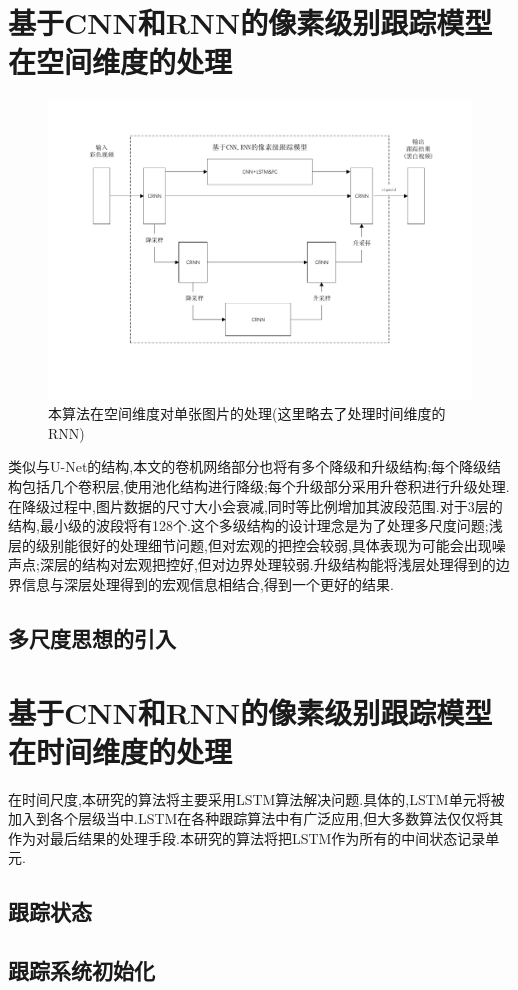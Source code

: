 \section{基于CNN和RNN的像素级别跟踪模型在空间维度的处理}
\par
\begin{figure}[htbp!]
    \centering
    \includegraphics[width = 1.\textwidth]{chap/img/space_process.pdf}
    \caption{本算法在空间维度对单张图片的处理(这里略去了处理时间维度的RNN)}
    \label{fig:space_process}
\end{figure}
\par
类似与U-Net的结构,本文的卷机网络部分也将有多个降级和升级结构;每个降级结构包括几个卷积层,使用池化结构进行降级;每个升级部分采用升卷积进行升级处理.在降级过程中,图片数据的尺寸大小会衰减,同时等比例增加其波段范围.对于3层的结构,最小级的波段将有128个.这个多级结构的设计理念是为了处理多尺度问题;浅层的级别能很好的处理细节问题,但对宏观的把控会较弱,具体表现为可能会出现噪声点;深层的结构对宏观把控好,但对边界处理较弱.升级结构能将浅层处理得到的边界信息与深层处理得到的宏观信息相结合,得到一个更好的结果.

\subsection{多尺度思想的引入}

\section{基于CNN和RNN的像素级别跟踪模型在时间维度的处理}
在时间尺度,本研究的算法将主要采用LSTM算法解决问题.具体的,LSTM单元将被加入到各个层级当中.LSTM在各种跟踪算法中有广泛应用,但大多数算法仅仅将其作为对最后结果的处理手段.本研究的算法将把LSTM作为所有的中间状态记录单元.
\subsection{跟踪状态}
\subsection{跟踪系统初始化}